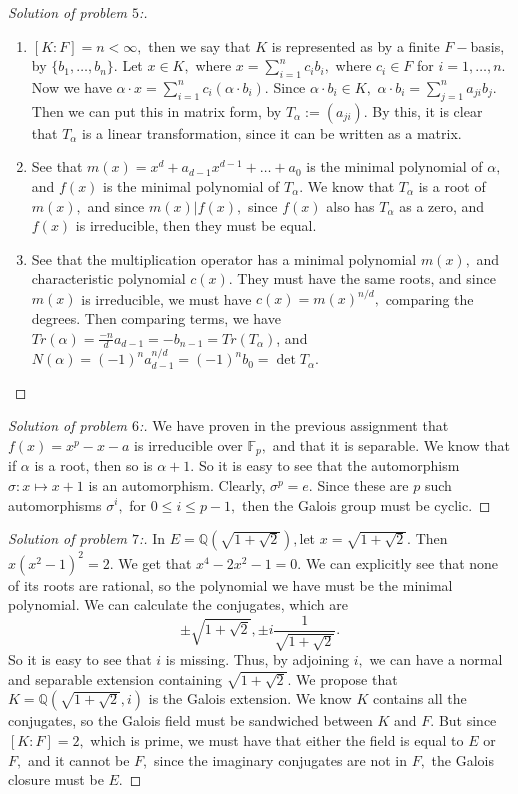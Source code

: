 \documentclass[letterpaper,11pt,twoside]{article}
\theoremstyle{proposition}
\theoremstyle{definition}
\theoremstyle{theorem}
\theoremstyle{definition}
\theoremstyle{definition}
\theoremstyle{definition}
\theoremstyle{lemma}
\theoremstyle{definition}
\theoremstyle{definition}
\theoremstyle{corollary}
\theoremstyle{definition}
\theoremstyle{definition}
\theoremstyle{definition}
\begin{document}
\begin{proof}[Solution of problem $5$:]
	\begin{enumerate}
		\item $[K:F]=n < \infty,$ then we say that $K$ is represented as by a finite $F-$basis, by $\{b_1,\dots, b_n\}.$ 
		Let $x \in K,$ where  $x= \sum_{i=1}^{n}c_ib_i,$ where $c_i \in F$ for $i=1,\dots,n.$
		Now we have $\alpha \cdot x= \sum_{i=1}^{n}c_i (\alpha \cdot b_i).$ Since $\alpha \cdot b_i \in K,$ $\alpha \cdot b_i= \sum_{j=1}^{n} a_{ji} b_j.$ 
		Then we can put this in matrix form, by $T_{\alpha}:= (a_{ji}).$ By this, it is clear that $T_{\alpha}$ is a linear transformation, since it can be 
		written as a matrix.
		
		\item See that $m(x)= x^d + a_{d-1}x^{d-1}+ \dots + a_0$ is the minimal polynomial of $\alpha,$ and $f(x)$ is the minimal polynomial of 
		$T_{\alpha}.$ We know that $T_{\alpha}$ is a root of $m(x),$ and since $m(x) | f(x),$ since $f(x)$ also has $T_{\alpha}$ as a zero, and $f(x)$ is 
		irreducible, then they must be equal.
		
		\item See that the multiplication operator has a minimal polynomial $m(x),$ and characteristic polynomial $c(x).$ They must have the same roots, and 
		since $m(x)$ is irreducible, we must have $c(x)=m(x)^{n/d},$ comparing the degrees. Then comparing terms, we have $Tr(\alpha) = 
		\frac{-n}{d}a_{d-1}=-b_{n-1}= Tr(T_{\alpha})$, and $N(\alpha) = (-1)^{n}a_{d-1}^{n/d}=(-1)^n b_0= \det T_\alpha.$ 
		
		
	\end{enumerate}
\end{proof}
\begin{proof}[Solution of problem $6$:]
	We have proven in the previous assignment that $f(x)=x^p-x-a$ is irreducible over $\mathbb{F}_p,$ and that it is separable.
	We know that if $\alpha$ is a root, then so is $\alpha + 1.$ So it is easy to see that the automorphism $\sigma: x \mapsto x+1 $ is an automorphism. 
	Clearly, $\sigma^p=e.$ Since these are $p$ such automorphisms $\sigma^i,$ for $0 \leq i \leq p-1,$ then the Galois group must be cyclic.
\end{proof}
\begin{proof}[Solution of problem $7$:]
	In $E=\mathbb{Q}(\sqrt{1+\sqrt{2}}),$let $x= \sqrt{1 + \sqrt{2}}.$ Then $x(x^2-1)^2=2.$ We get that $x^4-2x^2-1=0.$ We can explicitly see that none of 
	its roots are rational, so the polynomial we have must be the minimal polynomial. We can calculate the conjugates, which are $$\pm \sqrt{1+ \sqrt{2}}, 
	\pm i \frac{1}{\sqrt{1+ \sqrt{2}}}.$$ So it is easy to see that $i$ is missing. Thus, by adjoining $i,$ we can have a normal and separable extension 
	containing $\sqrt{1+ \sqrt{2}}.$ We propose that $K=\mathbb{Q}(\sqrt{1+ \sqrt{2}},i)$ is the Galois extension. We know $K$ contains all the conjugates, 
	so the Galois field must be sandwiched between $K$ and $F.$ But since $[K:F]=2,$ which is prime, we must have that either the field is equal to $E$ or 
	$F,$ and it cannot be $F,$ since the imaginary conjugates are not in $F,$ the Galois closure must be $E.$
\end{proof}
\end{document}
